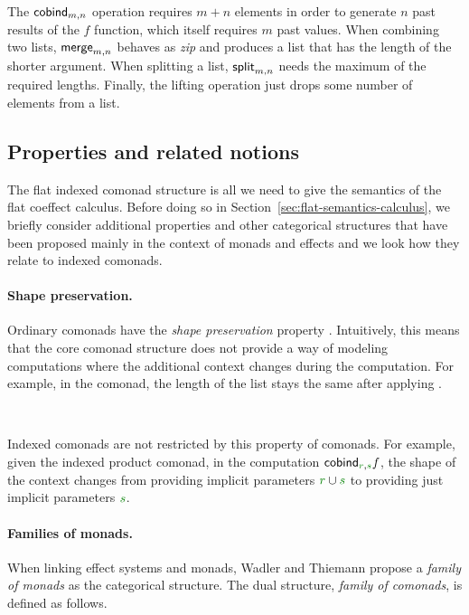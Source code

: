 The $\textnormal{\sffamily cobind}_{m,n}$ operation requires $m + n$ elements in order to generate $n$ past results 
of the $f$ function, which itself requires $m$ past values. When combining two lists, 
$\textnormal{\sffamily merge}_{m,n}$ behaves as \emph{zip} and produces a list that has the length of the shorter 
argument. When splitting a list, $\textnormal{\sffamily split}_{m, n}$ needs the maximum of the required lengths. 
Finally, the lifting operation just drops some number of elements from a list.


\subsection{Properties and related notions}

The flat indexed comonad structure is all we need to give the semantics of the flat coeffect 
calculus. Before doing so in Section~\ref{sec:flat-semantics-calculus}, we briefly consider 
additional properties and other categorical structures that have been proposed mainly in the 
context of monads and effects and we look how they relate to indexed comonads.

\paragraph{Shape preservation.}
Ordinary comonads have the \emph{shape preservation} property \cite{comonads-codo}. Intuitively, 
this means that the core comonad structure does not provide a way of modeling computations where
the additional context changes during the computation. For example, in the  comonad, 
the length of the list stays the same after applying .

~

Indexed comonads are not restricted by this property of comonads. For example, given the indexed
product comonad, in the computation $\ident{cobind}_{\cclrd{r}, \cclrd{s}} f$, the shape of
the context changes from providing implicit parameters $\cclrd{r} \cup \cclrd{s}$  to providing
just implicit parameters $\cclrd{s}$.

\paragraph{Families of monads.}
When linking effect systems and monads, Wadler and Thiemann \cite{monad-notions} propose a
\emph{family of monads} as the categorical structure. The dual structure, \emph{family of
comonads}, is defined as follows.

